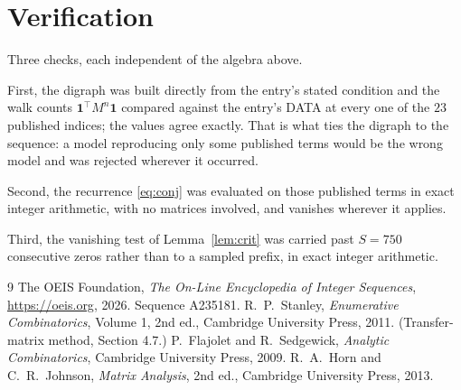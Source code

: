 \documentclass[11pt,a4paper]{article}
\theoremstyle{plain}
\theoremstyle{definition}
\begin{document}
\section{Verification}

Three checks, each independent of the algebra above.

First, the digraph was built directly from the entry's stated condition and the walk counts
$\mathbf{1}^{\!\top}M^{n}\mathbf{1}$ compared against the entry's DATA at every one of
the $23$ published indices; the values agree exactly. That is what ties the digraph to
the sequence: a model reproducing only some published terms would be the wrong model and
was rejected wherever it occurred.

Second, the recurrence \eqref{eq:conj} was evaluated on those published terms in exact
integer arithmetic, with no matrices involved, and vanishes wherever it applies.

Third, the vanishing test of Lemma~\ref{lem:crit} was carried past $S=750$ consecutive
zeros rather than to a sampled prefix, in exact integer arithmetic.

\begin{thebibliography}{9}
 The OEIS Foundation, \emph{The On-Line Encyclopedia of Integer
Sequences}, \url{https://oeis.org}, 2026. Sequence A235181.
 R.~P.~Stanley, \emph{Enumerative Combinatorics}, Volume 1, 2nd ed.,
Cambridge University Press, 2011. (Transfer-matrix method, Section 4.7.)
 P.~Flajolet and R.~Sedgewick, \emph{Analytic Combinatorics}, Cambridge
University Press, 2009.
 R.~A.~Horn and C.~R.~Johnson, \emph{Matrix Analysis}, 2nd ed., Cambridge
University Press, 2013.
\end{thebibliography}
\end{document}
